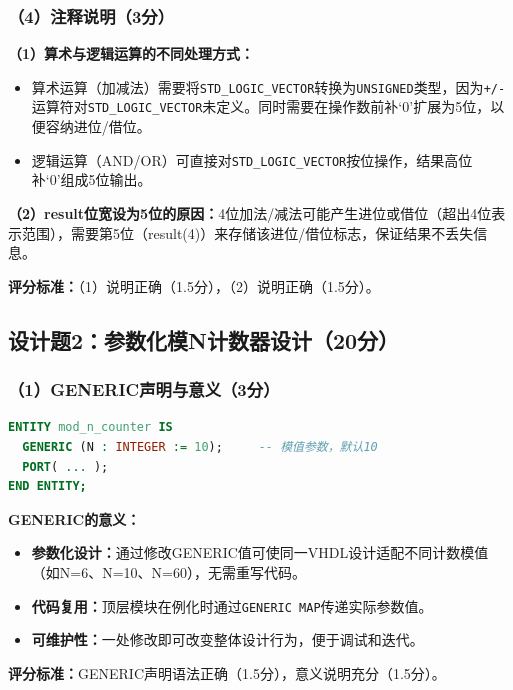 \subsubsection*{（4）注释说明（3分）}

\textbf{（1）算术与逻辑运算的不同处理方式：}
\begin{itemize}
  \item 算术运算（加减法）需要将\texttt{STD\_LOGIC\_VECTOR}转换为\texttt{UNSIGNED}类型，因为\texttt{+/-}运算符对\texttt{STD\_LOGIC\_VECTOR}未定义。同时需要在操作数前补`0'扩展为5位，以便容纳进位/借位。
  \item 逻辑运算（AND/OR）可直接对\texttt{STD\_LOGIC\_VECTOR}按位操作，结果高位补`0'组成5位输出。
\end{itemize}

\textbf{（2）result位宽设为5位的原因：}4位加法/减法可能产生进位或借位（超出4位表示范围），需要第5位（result(4)）来存储该进位/借位标志，保证结果不丢失信息。

\textbf{评分标准：}（1）说明正确（1.5分），（2）说明正确（1.5分）。

\newpage

\subsection*{设计题2：参数化模N计数器设计（20分）}

\subsubsection*{（1）GENERIC声明与意义（3分）}

\begin{lstlisting}[language=VHDL]
ENTITY mod_n_counter IS
  GENERIC (N : INTEGER := 10);     -- 模值参数，默认10
  PORT( ... );
END ENTITY;
\end{lstlisting}

\textbf{GENERIC的意义：}
\begin{itemize}
  \item \textbf{参数化设计：}通过修改GENERIC值可使同一VHDL设计适配不同计数模值（如N=6、N=10、N=60），无需重写代码。
  \item \textbf{代码复用：}顶层模块在例化时通过\texttt{GENERIC MAP}传递实际参数值。
  \item \textbf{可维护性：}一处修改即可改变整体设计行为，便于调试和迭代。
\end{itemize}
\textbf{评分标准：}GENERIC声明语法正确（1.5分），意义说明充分（1.5分）。

